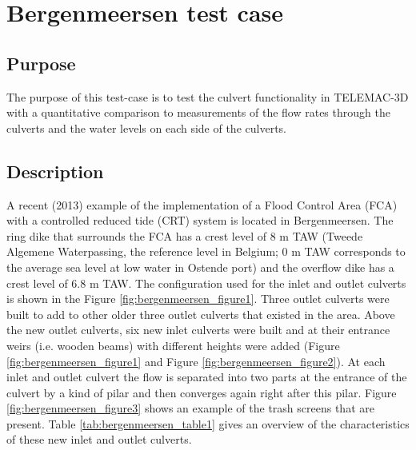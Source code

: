 
\chapter{Bergenmeersen test case}
%
%
\section{Purpose}
%
The purpose of this test-case is to test the culvert functionality in TELEMAC-3D with a quantitative comparison to
measurements of the flow rates through the culverts and the water levels on each side of the culverts.

\section{Description}
%
A recent (2013) example of the implementation of a Flood Control Area (FCA) with a controlled reduced
tide (CRT) system is located in Bergenmeersen.
The ring dike that surrounds the FCA has a crest level of 8 m TAW
(Tweede Algemene Waterpassing, the reference level in Belgium;
0 m TAW corresponds to the average sea level at low water in Ostende port)
and the overflow dike has a crest level of 6.8 m TAW.
The configuration used for the inlet and outlet culverts is shown in the Figure \ref{fig:bergenmeersen_figure1}.
Three outlet culverts were built to add to other older three outlet culverts that existed in the area.
Above the new outlet culverts, six new inlet culverts were built and at their entrance weirs (i.e. wooden beams)
with different heights were added (Figure \ref{fig:bergenmeersen_figure1} and Figure \ref{fig:bergenmeersen_figure2}).
At each inlet and outlet culvert the flow is separated into two parts at the entrance of the culvert
by a kind of pilar and then converges again right after this pilar.
Figure \ref{fig:bergenmeersen_figure3} shows an example of the trash screens that are present.
Table \ref{tab:bergenmeersen_table1} gives an overview of the characteristics of these new inlet and outlet culverts.

